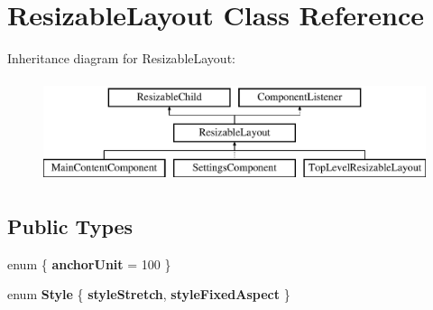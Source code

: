 \hypertarget{class_resizable_layout}{}\section{Resizable\+Layout Class Reference}
\label{class_resizable_layout}
Inheritance diagram for Resizable\+Layout\+:\begin{figure}[H]
\begin{center}
\leavevmode
\includegraphics[height=3.000000cm]{class_resizable_layout}
\end{center}
\end{figure}
\subsection*{Public Types}
\begin{DoxyCompactItemize}
\item 
enum \{ {\bfseries anchor\+Unit} = 100
 \}\hypertarget{class_resizable_layout_ab060b861a48a7de097545c90518e57d9}{}\label{class_resizable_layout_ab060b861a48a7de097545c90518e57d9}

\item 
enum {\bfseries Style} \{ {\bfseries style\+Stretch}, 
{\bfseries style\+Fixed\+Aspect}
 \}\hypertarget{class_resizable_layout_aff762c8fee36d1ee99283fac47eaf9a8}{}\label{class_resizable_layout_aff762c8fee36d1ee99283fac47eaf9a8}

\end{DoxyCompactItemize}
